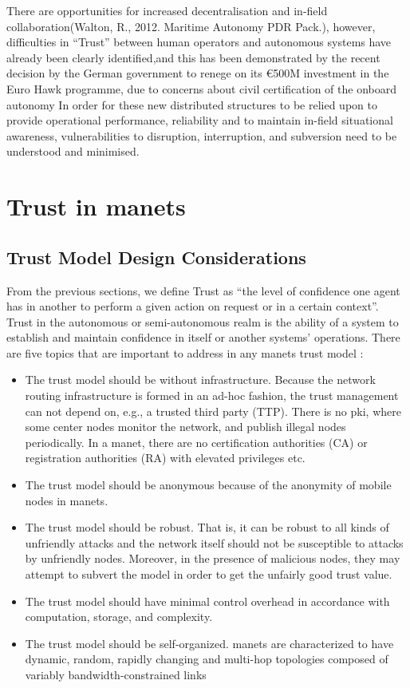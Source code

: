 There are opportunities for increased decentralisation and in-field collaboration(Walton, R., 2012. Maritime Autonomy PDR Pack.), however, difficulties in “Trust” between human operators and autonomous systems have already been clearly identified\cite{Chen2011b},and this has been demonstrated by the recent decision by the German government to renege on its €500M investment in the Euro Hawk programme, due to concerns about civil certification of the onboard autonomy\cite{Mehta2013}
In order for these new distributed structures to be relied upon to provide operational performance, reliability and to maintain in-field situational awareness, vulnerabilities to disruption, interruption, and subversion need to be understood and minimised.



\section{Trust in \glspl{manet}}

\subsection{Trust Model Design Considerations}

From the previous sections, we define Trust as ``the level of confidence one agent has in another to perform a given action on request or in a certain context''.
Trust in the autonomous or semi-autonomous realm is the ability of a system to establish and maintain confidence in itself or another systems' operations.
There are five topics that are important to address in any \gls{manet}s trust model \cite{Kamvar2003}:
%
\begin{itemize}
  \item The trust model should be without infrastructure.
    Because the network routing infrastructure is formed in an ad-hoc fashion, the trust management can not depend on, e.g., a trusted third party (TTP).
    There is no \gls{pki}, where some center nodes monitor the network, and publish illegal nodes periodically.
    In a \gls{manet}, there are no certification authorities (CA) or registration authorities (RA) with elevated privileges etc.
  \item The trust model should be anonymous because of the anonymity of mobile nodes in \gls{manet}s.
  \item The trust model should be robust.
    That is, it can be robust to all kinds of unfriendly attacks and the network itself should not be susceptible to attacks by unfriendly nodes.
    Moreover, in the presence of malicious nodes, they may attempt to subvert the model in order to get the unfairly good trust value.
  \item The trust model should have minimal control overhead in accordance with computation, storage, and complexity.
  \item The trust model should be self-organized.
    \glspl{manet} are characterized to have dynamic, random, rapidly changing and multi-hop topologies composed of variably bandwidth-constrained links
\end{itemize}
%

